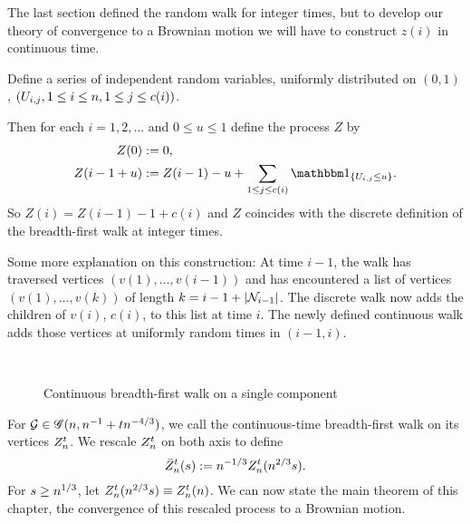 The last section defined the random walk for integer times,
but to develop our theory of convergence to a Brownian motion
we will have to construct $z(i)$ in continuous time.

Define a series of independent random variables, 
uniformly distributed on $(0,1)$, 
$(U_{i,j}, 1 \leq i \leq n, 1 \leq j \leq c(i))$.

Then for each $i = 1, 2, \dots$ and $0 \leq u \leq 1$ define the process $Z$ by
\begin{equation} \label{E: def Z}
\begin{aligned}
Z(0) &:= 0, \\
Z(i - 1 + u) &:= Z(i-1) - u + \sum_{1 \leq j \leq c(i)} \Ind{\{ \Uij \leq u \}}.
\end{aligned}
\end{equation}
So $Z(i) = Z(i-1) - 1 + c(i)$ 
and $Z$ coincides with the discrete definition of the breadth-first walk at integer times.

Some more explanation on this construction:
At time $i-1$, 
the walk has traversed vertices
$(v(1), \dots, v(i-1))$
and has encountered a list of vertices
$(v(1), \dots, v(k))$
of length
$k = i-1 + |\mathcal{N}_{i-1}|$.
The discrete walk now adds the children of $v(i)$,
$c(i)$, to this list at time $i$.
The newly defined continuous walk adds those vertices at uniformly random times in $(i-1, i)$.

\begin{figure}[H]
	\centering
	\\
	
	\centering
	
	\caption{Continuous breadth-first walk on a single component}
	\label{F: bf-walk cont}
\end{figure} 


For $\mathcal{G} \in \mathscr{G}(n, n^{-1} + tn^{-4/3})$, 
we call the continuous-time breadth-first walk on its vertices $Z_n^t$.
We rescale $Z_n^t$ on both axis to define
\begin{equation} \label{E: def Zbar}
\bar{Z}_n^t(s) := n^{-1 / 3} Z_n^t(n^{2 / 3}s).
\end{equation}
For $s \geq n^{1 / 3}$, 
let $Z_n^t(n^{2 / 3}s) \equiv Z_n^t(n)$.
We can now state the main theorem of this chapter,
the convergence of this rescaled process to a Brownian motion.

